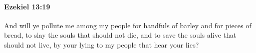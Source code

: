 
		\paragraph{Ezekiel 13:19} %
			\label{EZEKIEL-13-19}

			And will ye pollute me among my people for handfuls of barley and for pieces of bread, to slay the souls that should not die, and to save the souls alive that should not live, by your lying to my people that hear your lies?


